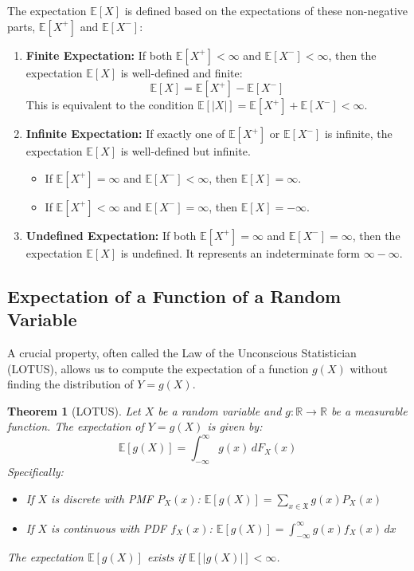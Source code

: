 \documentclass[11pt]{article}
\newtheorem{theorem}{Theorem}[section]       %
\theoremstyle{definition} %
\newcommand{\R}{\mathbb{R}}     %
\newcommand{\E}{\mathbb{E}}     %
\newcommand{\Xset}{\mathfrak{X}} %
\begin{document}
The expectation $\E[X]$ is defined based on the expectations of these non-negative parts, $\E[X^+]$ and $\E[X^-]$:

\begin{enumerate}
    \item \textbf{Finite Expectation:} If both $\E[X^+] < \infty$ and $\E[X^-] < \infty$, then the expectation $\E[X]$ is well-defined and finite:
    \[
    \E[X] = \E[X^+] - \E[X^-]
    \]
    This is equivalent to the condition $\E[|X|] = \E[X^+] + \E[X^-] < \infty$.

    \item \textbf{Infinite Expectation:} If exactly one of $\E[X^+]$ or $\E[X^-]$ is infinite, the expectation $\E[X]$ is well-defined but infinite.
    \begin{itemize}
        \item If $\E[X^+] = \infty$ and $\E[X^-] < \infty$, then $\E[X] = \infty$.
        \item If $\E[X^+] < \infty$ and $\E[X^-] = \infty$, then $\E[X] = -\infty$.
    \end{itemize}

    \item \textbf{Undefined Expectation:} If both $\E[X^+] = \infty$ and $\E[X^-] = \infty$, then the expectation $\E[X]$ is undefined. It represents an indeterminate form $\infty - \infty$.
\end{enumerate}

\subsection{Expectation of a Function of a Random Variable}
\label{subsec:lotus}

A crucial property, often called the Law of the Unconscious Statistician (LOTUS), allows us to compute the expectation of a function $g(X)$ without finding the distribution of $Y=g(X)$.

\begin{theorem}[LOTUS]
Let $X$ be a random variable and $g: \R \to \R$ be a measurable function. The expectation of $Y = g(X)$ is given by:
\[
\E[g(X)] = \int_{-\infty}^{\infty} g(x) \, dF_X(x)
\]
Specifically:
\begin{itemize}
    \item If $X$ is discrete with PMF $P_X(x)$: $\E[g(X)] = \sum_{x \in \Xset} g(x) P_X(x)$
    \item If $X$ is continuous with PDF $f_X(x)$: $\E[g(X)] = \int_{-\infty}^{\infty} g(x) f_X(x) \, dx$
\end{itemize}
The expectation $\E[g(X)]$ exists if $\E[|g(X)|] < \infty$.
\end{theorem}
\end{document}
